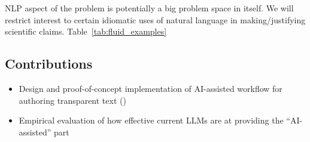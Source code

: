 NLP aspect of the problem is potentially a big problem space in itself. We will restrict interest to certain
idiomatic uses of natural language in making/justifying scientific claims. Table~\ref{tab:fluid_examples}



\subsection{Contributions}

\begin{itemize}
    \item Design and proof-of-concept implementation of AI-assisted workflow for authoring transparent text
    ()
    \item Empirical evaluation of how effective current LLMs are at providing the ``AI-assisted'' part
\end{itemize}
